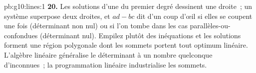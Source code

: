 \begin{solution}{pb:g10:lines:1}
\textbf{20.} Les solutions d'une  du premier degré dessinent
une droite~; un système superpose deux droites, et $ad - bc$ dit d'un
coup d'œil si elles se coupent une fois (déterminant non nul) ou si
l'on tombe dans les cas parallèles-ou-confondues (déterminant nul).
Empilez plutôt des inéquations et les solutions forment une région
polygonale dont les sommets portent tout optimum linéaire. L'algèbre
linéaire généralise le déterminant à un nombre quelconque
d'inconnues~; la programmation linéaire industrialise les sommets.
\end{solution}
